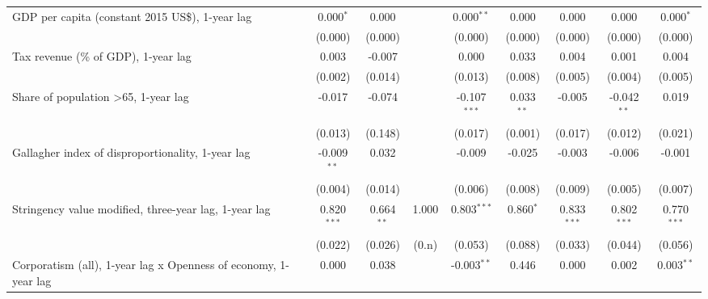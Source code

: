 \begin{table}[htbp]
\begin{tabular}{lcccccccc}
      GDP per capita (constant 2015 US\$), 1-year lag                 & 0.000$^{*}$   & 0.000                     &              & 0.000$^{**}$   & 0.000            & 0.000           & 0.000           & 0.000$^{*}$\\   
                                                                      & (0.000)       & (0.000)                   &              & (0.000)        & (0.000)          & (0.000)         & (0.000)         & (0.000)\\   
      Tax revenue (\% of GDP), 1-year lag                             & 0.003         & -0.007                    &              & 0.000          & 0.033            & 0.004           & 0.001           & 0.004\\   
                                                                      & (0.002)       & (0.014)                   &              & (0.013)        & (0.008)          & (0.005)         & (0.004)         & (0.005)\\   
      Share of population >65, 1-year lag                             & -0.017        & -0.074                    &              & -0.107$^{***}$ & 0.033$^{**}$     & -0.005          & -0.042$^{**}$   & 0.019\\   
                                                                      & (0.013)       & (0.148)                   &              & (0.017)        & (0.001)          & (0.017)         & (0.012)         & (0.021)\\   
      Gallagher index of disproportionality, 1-year lag               & -0.009$^{**}$ & 0.032                     &              & -0.009         & -0.025           & -0.003          & -0.006          & -0.001\\   
                                                                      & (0.004)       & (0.014)                   &              & (0.006)        & (0.008)          & (0.009)         & (0.005)         & (0.007)\\   
      Stringency value modified, three-year lag, 1-year lag           & 0.820$^{***}$ & 0.664$^{**}$              & 1.000        & 0.803$^{***}$  & 0.860$^{*}$      & 0.833$^{***}$   & 0.802$^{***}$   & 0.770$^{***}$\\   
                                                                      & (0.022)       & (0.026)                   & (0.n)        & (0.053)        & (0.088)          & (0.033)         & (0.044)         & (0.056)\\   
      Corporatism (all), 1-year lag x Openness of economy, 1-year lag & 0.000         & 0.038                     &              & -0.003$^{**}$  & 0.446            & 0.000           & 0.002           & 0.003$^{**}$\\   

\end{tabular}
\end{table}
